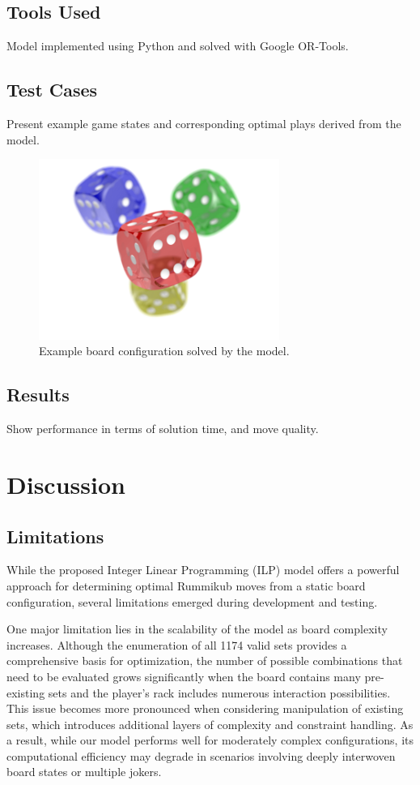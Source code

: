 \documentclass[11pt,letterpaper]{article}
\begin{document}
\subsection*{Tools Used}
Model implemented using Python and solved with Google OR-Tools\cite{or_tools}.

\subsection*{Test Cases}
Present example game states and corresponding optimal plays derived from the model.


\begin{figure}[h]
    \centering
    \includegraphics[width=0.7\textwidth]{Figures/example_image.png}
    \caption{Example board configuration solved by the model.}
\end{figure}

\subsection*{Results}
Show performance in terms of solution time, and move quality.

\section*{Discussion}

\subsection*{Limitations}

While the proposed Integer Linear Programming (ILP) model offers a powerful approach for determining optimal Rummikub moves from a static board configuration, several limitations emerged during development and testing.

One major limitation lies in the scalability of the model as board complexity increases. Although the enumeration of all 1174 valid sets provides a comprehensive basis for optimization, the number of possible combinations that need to be evaluated grows significantly when the board contains many pre-existing sets and the player’s rack includes numerous interaction possibilities. This issue becomes more pronounced when considering manipulation of existing sets, which introduces additional layers of complexity and constraint handling. As a result, while our model performs well for moderately complex configurations, its computational efficiency may degrade in scenarios involving deeply interwoven board states or multiple jokers.
\end{document}
